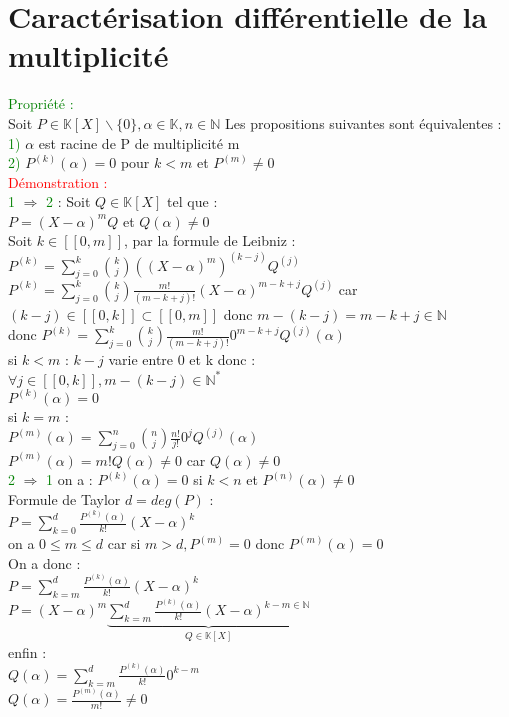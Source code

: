 \documentclass{article}
\begin{document}
\section{Caractérisation différentielle de la multiplicité}
\textcolor{green}{Propriété :} \\
Soit $P \in \mathbb K [X] \backslash \lbrace 0 \rbrace, \alpha \in \mathbb K, n \in \mathbb N$ Les propositions suivantes sont équivalentes : \\
\textcolor{green}{1)} $\alpha$ est racine de P de multiplicité m \\
\textcolor{green}{2)} $P^{(k)}(\alpha)=0$ pour $k<m$ et $P^{(m)}\neq 0$ \\
\textcolor{red}{Démonstration :} \\
\textcolor{green}{1} $\Rightarrow$ \textcolor{green}{2} : Soit $Q \in \mathbb K [X]$ tel que : \\
$P=(X-\alpha)^mQ$ et $Q(\alpha)\neq0$ \\
Soit $k\in [[0,m]]$, par la formule de Leibniz : \\
$P^{(k)}=\sum_{j=0}^k \binom{k}{j}((X- \alpha)^m)^{(k-j)}Q^{(j)}$
$P^{(k)}=\sum_{j=0}^k \binom{k}{j} \frac{m!}{(m-k+j)!}(X- \alpha)^{m-k+j}Q^{(j)}$ car $(k-j) \in [[0,k]] \subset [[0,m]]$ donc $m-(k-j)=m-k+j \in \mathbb N$ \\
donc $P^{(k)}=\sum_{j=0}^k \binom{k}{j} \frac{m!}{(m-k+j)!}0^{m-k+j}Q^{(j)}(\alpha)$ \\
si $k<m$ : $k-j$ varie entre 0 et k donc : \\
$\forall j \in [[0,k]], m-(k-j) \in \mathbb N^*$ \\
$P^{(k)}(\alpha)=0$ \\
si $k=m$ : \\
$P^{(m)}(\alpha)=\sum_{j=0}^n \binom{n}{j} \frac{n!}{j!}0^j Q^{(j)}(\alpha)$ \\
$P^{(m)}(\alpha)=m! Q(\alpha) \neq 0$ car $Q(\alpha) \neq 0$ \\
\textcolor{green}{2} $\Rightarrow$ \textcolor{green}{1} on a : $P^{(k)}(\alpha)=0$ si $k<n$ et $P^{(n)}(\alpha)\neq 0$ \\
Formule de Taylor $d=deg(P)$ : \\
$P=\sum_{k=0}^d \frac{P^{(k)}(\alpha)}{k!}(X-\alpha)^k$ \\
on a $0 \leq m \leq d$ car si $m>d,P^{(m)}=0$ donc $P^{(m)}(\alpha)=0$ \\
On a donc : \\
$P=\sum_{k=m}^d \frac{P^{(k)}(\alpha)}{k!}(X-\alpha)^k$ \\
$P=(X-\alpha)^m\underbrace{\sum_{k=m}^d \frac{P^{(k)}(\alpha)}{k!}(X-\alpha)^{k-m \in \mathbb N}}_{Q \in \mathbb K[X]}$ \\
enfin : \\
$Q(\alpha)=\sum_{k=m}^d\frac{P^{(k)}(\alpha)}{k!}0^{k-m} $ \\
$Q(\alpha)=\frac{P^{(m)}(\alpha)}{m!} \neq 0$
\end{document}
